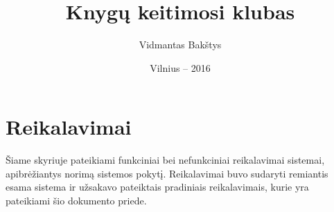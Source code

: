 \documentclass{VUMIFPSkursinis}
\title{Knygų keitimosi klubas}
\author{Vidmantas Bakštys}
\date{Vilnius – 2016}
\begin{document}
\maketitle

\setcounter{tocdepth}{2}

\tableofcontents
{} 

\setcounter{secnumdepth}{0}



%
\setcounter{secnumdepth}{4}

\section{Reikalavimai}
	Šiame skyriuje pateikiami funkciniai bei nefunkciniai reikalavimai sistemai, apibrėžiantys norimą sistemos pokytį.
	Reikalavimai buvo sudaryti remiantis esama sistema ir užsakavo pateiktais pradiniais reikalavimais,
	kurie yra pateikiami šio dokumento priede.
\end{document}
